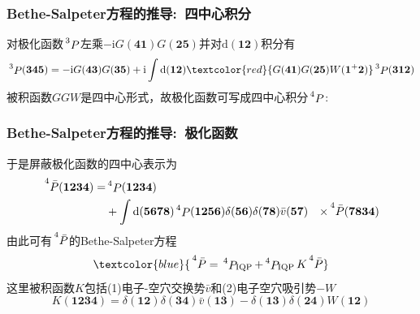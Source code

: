 \frame
{
	\frametitle{\textrm{Bethe-Salpeter}方程的推导:~四中心积分}
	对极化函数$\sideset{^3}{}{\mathop{P}}$左乘$-\mathrm{i}G(\mathbf{41})G(\mathbf{25})$并对$\mathrm{d}(\mathbf{12})$积分有
	\begin{displaymath}
		\sideset{^3}{}{\mathop{P}}(\mathbf{345})=-\mathrm{i}G(\mathbf{43})G(\mathbf{35})+\mathrm{i}\int\mathrm{d}(\mathbf{12})\textcolor{red}{G(\mathbf{41})G(\mathbf{25})W(\mathbf{1}^{+}\mathbf{2})}\sideset{^3}{}{\mathop{P}}(\mathbf{312})
	\end{displaymath}
	被积函数$GGW$是四中心形式，故极化函数可写成四中心积分$\sideset{^4}{}{\mathop{P}}$:\\
	{\fontsize{8.0pt}{6.2pt}}
}

\frame
{
	\frametitle{\textrm{Bethe-Salpeter}方程的推导:~极化函数}
	于是屏蔽极化函数的四中心表示为
	\begin{displaymath}
		\begin{aligned}
			\sideset{^4}{}{\mathop{\bar{P}}}(\mathbf{1234})=&\sideset{^4}{}{\mathop{P}}(\mathbf{1234})\\
			&+\int\mathrm{d}(\mathbf{5678})\sideset{^4}{}{\mathop{P}}(\mathbf{1256})\delta(\mathbf{56})\delta(\mathbf{78})\bar{v}(\mathbf{57})
			&\times\sideset{^4}{}{\mathop{\bar{P}}}(\mathbf{7834})
		\end{aligned}
	\end{displaymath}
	由此可有$\sideset{^4}{}{\mathop{\bar{P}}}$的\textrm{Bethe-Salpeter}方程
	\begin{displaymath}
		\textcolor{blue}{\sideset{^4}{}{\mathop{\bar{P}}}=\sideset{^4}{_{\mathrm{IQP}}}{\mathop{P}}+\sideset{^4}{_{\mathrm{IQP}}}{\mathop{P}}K\sideset{^4}{}{\mathop{\bar{P}}}}
	\end{displaymath}
	这里被积函数$K$包括(1)电子-空穴交换势$\bar{v}$和(2)电子空穴吸引势$-W$
	\begin{displaymath}
		K(\mathbf{1234})=\delta(\mathbf{12})\delta(\mathbf{34})\bar{v}(\mathbf{13})-\delta(\mathbf{13})\delta(\mathbf{24})W(\mathbf{12})
	\end{displaymath}
}

